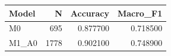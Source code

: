 \begin{tabular}{lrrr}
\toprule
Model & N & Accuracy & Macro_F1 \\
\midrule
M0 & 695 & 0.877700 & 0.718500 \\
M1_A0 & 1778 & 0.902100 & 0.748900 \\
\bottomrule
\end{tabular}
